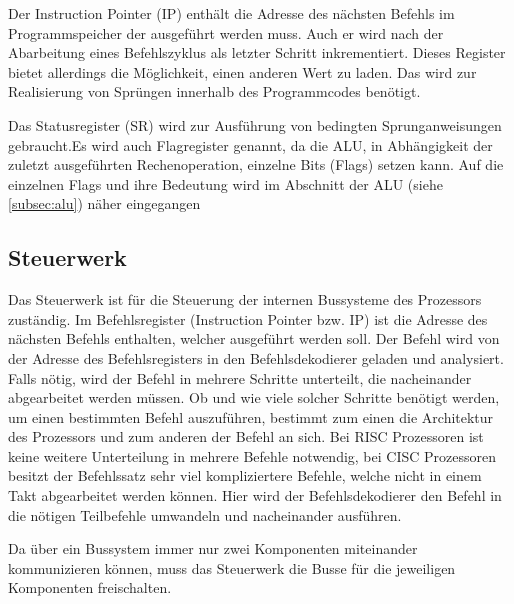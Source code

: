 \documentclass[a4paper,12pt]{article}
\begin{document}
\par \bigskip
\noindent Der Instruction Pointer (IP) enthält die Adresse des nächsten Befehls im Programmspeicher der ausgeführt werden muss. Auch er wird nach der Abarbeitung eines Befehlszyklus als letzter Schritt inkrementiert. Dieses Register bietet allerdings die Möglichkeit, einen anderen Wert zu laden. Das wird zur Realisierung von Sprüngen innerhalb des Programmcodes benötigt. 

\par \bigskip
\noindent Das Statusregister (SR) wird zur Ausführung von bedingten Sprunganweisungen gebraucht.\newline Es wird auch Flagregister genannt, da die ALU, in Abhängigkeit der zuletzt ausgeführten Rechenoperation, einzelne Bits (Flags) setzen kann. Auf die einzelnen Flags und ihre Bedeutung wird im Abschnitt der ALU (siehe \ref{subsec:alu}) näher eingegangen

\subsection{Steuerwerk}
Das Steuerwerk ist für die Steuerung der internen Bussysteme des Prozessors zuständig. Im Befehlsregister (Instruction Pointer bzw. IP) ist die Adresse des nächsten Befehls enthalten, welcher ausgeführt werden soll. Der Befehl wird von der Adresse des Befehlsregisters in den Befehlsdekodierer geladen und analysiert. Falls nötig, wird der Befehl in mehrere Schritte unterteilt, die nacheinander abgearbeitet werden müssen. Ob und wie viele solcher Schritte benötigt werden, um einen bestimmten Befehl auszuführen, bestimmt zum einen die Architektur des Prozessors und zum anderen der Befehl an sich. Bei RISC Prozessoren ist keine weitere Unterteilung in mehrere Befehle notwendig, bei CISC Prozessoren besitzt der Befehlssatz sehr viel kompliziertere Befehle, welche nicht in einem Takt abgearbeitet werden können. Hier wird der Befehlsdekodierer den Befehl in die nötigen Teilbefehle umwandeln und nacheinander ausführen.

\par\smallskip\noindent Da über ein Bussystem immer nur zwei Komponenten miteinander kommunizieren können, muss das Steuerwerk die Busse für die jeweiligen Komponenten freischalten. 
\end{document}

